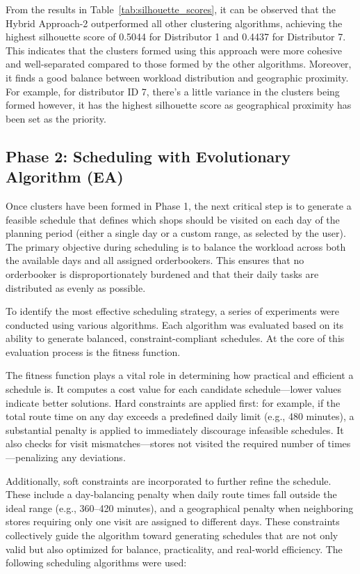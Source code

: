From the results in Table~\ref{tab:silhouette_scores}, it can be observed that the Hybrid Approach-2 outperformed all other clustering algorithms, achieving the highest silhouette score of 0.5044 for Distributor 1 and 0.4437 for Distributor 7. This indicates that the clusters formed using this approach were more cohesive and well-separated compared to those formed by the other algorithms.
Moreover, it finds a good balance between workload distribution and geographic proximity. For example, for distributor ID 7, there's a little variance in the clusters being formed however, it has the highest silhouette score as geographical proximity has been set as the priority.



\subsection{Phase 2: Scheduling with Evolutionary Algorithm (EA)} %
Once clusters have been formed in Phase 1, the next critical step is to generate a feasible schedule that defines which shops should be visited on each day of the planning period (either a single day or a custom range, as selected by the user). The primary objective during scheduling is to balance the workload across both the available days and all assigned orderbookers. This ensures that no orderbooker is disproportionately burdened and that their daily tasks are distributed as evenly as possible.

To identify the most effective scheduling strategy, a series of experiments were conducted using various algorithms. Each algorithm was evaluated based on its ability to generate balanced, constraint-compliant schedules. At the core of this evaluation process is the fitness function.

The fitness function plays a vital role in determining how practical and efficient a schedule is. It computes a cost value for each candidate schedule—lower values indicate better solutions. Hard constraints are applied first: for example, if the total route time on any day exceeds a predefined daily limit (e.g., 480 minutes), a substantial penalty is applied to immediately discourage infeasible schedules. It also checks for visit mismatches—stores not visited the required number of times—penalizing any deviations.

Additionally, soft constraints are incorporated to further refine the schedule. These include a day-balancing penalty when daily route times fall outside the ideal range (e.g., 360–420 minutes), and a geographical penalty when neighboring stores requiring only one visit are assigned to different days. These constraints collectively guide the algorithm toward generating schedules that are not only valid but also optimized for balance, practicality, and real-world efficiency. The following scheduling algorithms were used:

